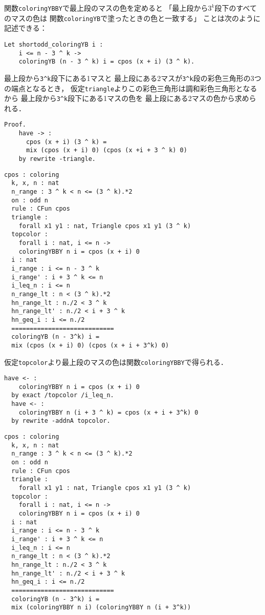 関数{\tt{coloringYBBY}}で最上段のマスの色を定めると
「最上段から$3^k$段下のすべてのマスの色は
  関数{\tt{coloringYB}}で塗ったときの色と一致する」
ことは次のように記述できる：
\begin{lstlisting}[language=Coq]
  Let shortodd_coloringYB i :
    i <= n - 3 ^ k ->
    coloringYB (n - 3 ^ k) i = cpos (x + i) (3 ^ k).
\end{lstlisting}
最上段から{\tt{3\verb|^|k}}段下にある1マスと
最上段にある2マスが{\tt{3\verb|^|k}}段の彩色三角形の3つの端点となるとき，
仮定{\tt{triangle}}よりこの彩色三角形は調和彩色三角形となるから
最上段から{\tt{3\verb|^|k}}段下にある1マスの色を
最上段にある2マスの色から求められる．
\begin{lstlisting}[language=Coq]
  Proof.
    have -> :
      cpos (x + i) (3 ^ k) =
      mix (cpos (x + i) 0) (cpos (x +i + 3 ^ k) 0)
    by rewrite -triangle.
\end{lstlisting}
\begin{lstlisting}[language=Coq]
  cpos : coloring
  k, x, n : nat
  n_range : 3 ^ k < n <= (3 ^ k).*2
  on : odd n
  rule : CFun cpos
  triangle :
    forall x1 y1 : nat, Triangle cpos x1 y1 (3 ^ k)
  topcolor :
    forall i : nat, i <= n ->
    coloringYBBY n i = cpos (x + i) 0
  i : nat
  i_range : i <= n - 3 ^ k
  i_range' : i + 3 ^ k <= n
  i_leq_n : i <= n
  n_range_lt : n < (3 ^ k).*2
  hn_range_lt : n./2 < 3 ^ k
  hn_range_lt' : n./2 < i + 3 ^ k
  hn_geq_i : i <= n./2
  ============================
  coloringYB (n - 3^k) i =
  mix (cpos (x + i) 0) (cpos (x + i + 3^k) 0)
\end{lstlisting}
仮定{\tt{topcolor}}より最上段のマスの色は関数{\tt{coloringYBBY}}で得られる．
\begin{lstlisting}[language=Coq]
  have <- :
    coloringYBBY n i = cpos (x + i) 0
  by exact /topcolor /i_leq_n.
  have <- :
    coloringYBBY n (i + 3 ^ k) = cpos (x + i + 3^k) 0
  by rewrite -addnA topcolor.
\end{lstlisting}
\begin{lstlisting}[language=Coq]
  cpos : coloring
  k, x, n : nat
  n_range : 3 ^ k < n <= (3 ^ k).*2
  on : odd n
  rule : CFun cpos
  triangle :
    forall x1 y1 : nat, Triangle cpos x1 y1 (3 ^ k)
  topcolor :
    forall i : nat, i <= n ->
    coloringYBBY n i = cpos (x + i) 0
  i : nat
  i_range : i <= n - 3 ^ k
  i_range' : i + 3 ^ k <= n
  i_leq_n : i <= n
  n_range_lt : n < (3 ^ k).*2
  hn_range_lt : n./2 < 3 ^ k
  hn_range_lt' : n./2 < i + 3 ^ k
  hn_geq_i : i <= n./2
  ============================
  coloringYB (n - 3^k) i =
  mix (coloringYBBY n i) (coloringYBBY n (i + 3^k))
\end{lstlisting}
